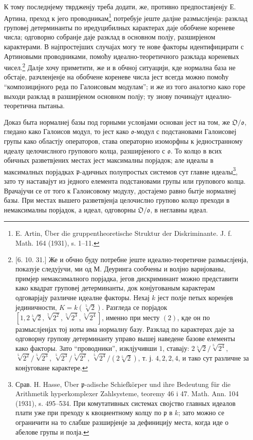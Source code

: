 \documentclass[11pt]{article}
\providecommand{\frakO}{\mathfrak{O}}
\providecommand{\frako}{\mathfrak{o}}
\providecommand{\frakp}{\mathfrak{p}}
\begin{document}
К тому последнјему тврдженју треба додати, же, противно предпоставјенју Е. Артина, преход к јего проводникам\footnote{E. Artin, Über die gruppentheoretische Struktur der Diskriminante. J. f. Math. 164 (1931), s. 1--11.} потребује јеште далјне размыслјенја: разклад груповеј детерминанты по иредуцибилных карактерах даје обобчене кореневе числа; одговорно собранје даје разклад в основном полју, разширјеном карактерами. В најпростејших случајах могу те нове факторы идентифицирати с Артиновыми проводниками, помоћу идеално-теоретичного разклада кореневых чисел.\footnote{[6. 10. 31.] Же и обчно буду потребне јеште идеално-теоретичне размыслјенја, показује следујучи, ми од М. Деуринга сообчены и волјно варијованы, примјер немаксималного порјадка, јегов дискриминант можно представити како квадрат груповеј детерминанты, док конјугованым карактерам одговарјају различне идеалне факторы. Нехај \(k\) јест полје петых коренјев јединичности, \(K=k(\sqrt[5]{2})\). Разгледа се порјадок \([1,2\sqrt[5]{2},\sqrt[5]{2^2},\sqrt[5]{2^3},\sqrt[5]{2^4}]\), именно при месту \((2)\), кде он по размыслјенјах тој ноты има нормалну базу. Разклад по карактерах даје за одговорну групову детерминанту управо вышеј наведене базове елементы како факторы. Зато ``проводники'', изклјучивши \(1\), ставају: \(2\sqrt[5]{2}/\sqrt[5]{2^4}\), \(\sqrt[5]{2^2}/\sqrt[5]{2^3}\), \(\sqrt[5]{2^3}/\sqrt[5]{2^2}\), \(\sqrt[5]{2^4}/(2\sqrt[5]{2})\), т. ј. \(4,2,2,4\), и тако сут различне за конјуговане карактере.} Далје хочу приметити, же и в обчној ситуацији, кде нормална база не обстаје, разчленјенје на обобчене кореневе числа јест всегда можно помоћу ``композицијного реда по Галоисовым модулам''; и же из того аналогно како горе выходи разклад в разширјеном основном полју; ту знову починајут идеално-теоретична пытаньа.

Доказ быта нормалнеј базы под горными условјами основан јест на том, же \(\frakO/\frako\), гледано како Галоисов модул, то јест како \(\frako\)-модул с подстановами Галоисовеј групы како областју операторов, става операторно изоморфны к једностранному идеалу целочислного групового колца, разширјеного с \(\frako\). То колцо в всих обичных разветвјених местах јест максималны порјадок; але идеалы в максималных порјадках \(\frakp\)-адичных полупростых системов сут главне идеалы\footnote{Срав. H. Hasse, Über \(\frakp\)-adische Schiefkörper und ihre Bedeutung für die Arithmetik hyperkomplexer Zahlsysteme, teoremy 46 i 47. Math. Ann. 104 (1931), s. 495--534. При комутативных системах својство главных идеалов плати уже при преходу к квоциентному колцу по \(\frakp\) в \(k\); зато можно се ограничити на то слабше разширјенје за дефиницију места, когда иде о абелове групы и полја.}, зато ту наставајут из једного елемента подстановами групы или групового колца. Врачајучи се от того к Галоисовому модулу, достајемо равно бытје нормалнеј базы. При местах вышего разветвјенја целочислно групово колцо преходи в немаксималны порјадок, а идеал, одговорны \(\frakO/\frako\), в неглавны идеал.
\end{document}
